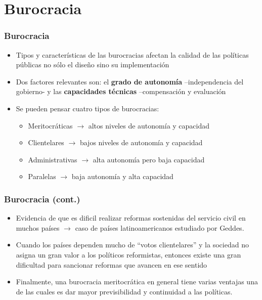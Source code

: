 \documentclass[14pt,aspectratio=169]{beamer}
\begin{document}
    
  \section{Burocracia}

  \begin{frame}\frametitle{Burocracia}
    \begin{itemize}
    \item Tipos y características de las burocracias afectan la
      calidad de las políticas públicas no sólo el diseño sino su implementación
      \item Dos factores relevantes son: el \textbf{grado de
          autonomía} --independencia del gobierno- y las
        \textbf{capacidades técnicas} --compensación y evaluación
      \item Se pueden pensar cuatro tipos de burocracias:
        \begin{itemize}\itemsep 5pt
        \item Meritocráticas $\longrightarrow$ altos
          niveles de autonomía y capacidad
          \item Clientelares $\longrightarrow$ bajos
            niveles de autonomía y capacidad
            \item Administrativas $\longrightarrow$ alta
              autonomía pero baja capacidad
              \item Paralelas $\longrightarrow$ baja
                autonomía y alta capacidad
          \end{itemize}
      \end{itemize}
    \end{frame}


 \begin{frame}\frametitle{Burocracia (cont.)}
    \begin{itemize}
    \item Evidencia de que es dificil realizar reformas sostenidas del
      servicio civil en muchos países $\longrightarrow$ caso de países
      latinoamericanos estudiado por Geddes.
      \item Cuando los países dependen mucho de ``votos clientelares''
        y la sociedad no asigna un gran valor a los políticos
        reformistas, entonces existe una gran dificultad para
        sancionar reformas que avancen en ese sentido
        \item Finalmente, una burocracia meritocrática en general
          tiene varias ventajas una de las cuales es dar mayor
          previsibilidad y continuidad a las políticas. 
      \end{itemize}
    \end{frame}
\end{document}
